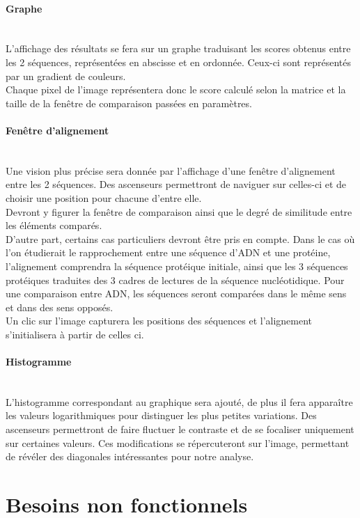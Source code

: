 \documentclass{report}
\begin{document}
\paragraph{Graphe} ~\\
	L'affichage des résultats se fera sur un graphe traduisant les scores obtenus entre les 2 séquences, représentées en abscisse et en ordonnée. Ceux-ci sont représentés par un gradient de couleurs.\\
Chaque pixel de l'image représentera donc le score calculé selon la matrice et la taille de la fenêtre de comparaison passées en paramètres.

\paragraph{Fenêtre d'alignement} ~\\
	Une vision plus précise sera donnée par l'affichage d'une fenêtre d'alignement entre les 2 séquences.
Des ascenseurs permettront de naviguer sur celles-ci et de choisir une position pour chacune d'entre elle.\\
Devront y figurer la fenêtre de comparaison ainsi que le degré de similitude entre les éléments comparés.\\
D'autre part, certains cas particuliers devront être pris en compte.
Dans le cas où l'on étudierait le rapprochement entre une séquence d'ADN et une protéine, l'alignement comprendra la séquence protéique initiale, ainsi que les 3 séquences protéiques traduites des 3 cadres de lectures de la séquence nucléotidique.
Pour une comparaison entre ADN, les séquences seront comparées dans le même sens et dans des sens opposés.\\
Un clic sur l'image capturera les positions des séquences et l'alignement s'initialisera à partir de celles ci.

\paragraph{Histogramme} ~\\

L'histogramme correspondant au graphique sera ajouté, de plus il fera apparaître les valeurs logarithmiques pour distinguer les plus petites variations.
Des ascenseurs permettront de faire fluctuer le contraste et de se focaliser uniquement sur certaines valeurs. Ces modifications  se répercuteront sur l'image, permettant de révéler des diagonales intéressantes pour notre analyse.

\section{Besoins non fonctionnels}
\end{document}
